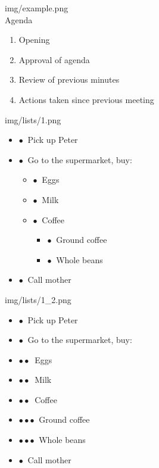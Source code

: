 \documentclass[14pt]{article}
\begin{document}
\fontsize{14}{14}\selectfont
\noindent
img/example.png\\[.5cm]
Agenda
\begin{enumerate}
\item Opening
\item Approval of agenda
\item Review of previous minutes
\item Actions taken since previous meeting
\end{enumerate}
\noindent
img/lists/1.png
\begin{itemize}
\setlength{\itemsep}{0pt}
\setlength{\parskip}{0pt}
\setlength{\parsep}{0pt}
\item $\bullet\ $ Pick up Peter
\item $\bullet\ $ Go to the supermarket, buy:
\begin{itemize}
\setlength{\itemsep}{0pt}
\setlength{\parskip}{0pt}
\setlength{\parsep}{0pt}
\item $\bullet\ $ Eggs
\item $\bullet\ $ Milk
\item $\bullet\ $ Coffee
\begin{itemize}
\setlength{\itemsep}{0pt}
\setlength{\parskip}{0pt}
\setlength{\parsep}{0pt}
\item $\bullet\ $ Ground coffee
\item $\bullet\ $ Whole beans
\end{itemize}
\end{itemize}
\item $\bullet\ $ Call mother
\end{itemize}
\noindent
img/lists/1\_2.png
\begin{itemize}
\setlength{\itemsep}{1pt}
\setlength{\parskip}{0pt}
\setlength{\parsep}{0pt}
\item $\bullet\ $ Pick up Peter
\item $\bullet\ $ Go to the supermarket, buy:
\item $\bullet\bullet\ $ Eggs
\item $\bullet\bullet\ $ Milk
\item $\bullet\bullet\ $ Coffee
\item $\bullet\bullet$$\bullet\ $ Ground coffee
\item $\bullet\bullet$$\bullet\ $ Whole beans
\item $\bullet\ $ Call mother
\end{itemize}
\noindent
\end{document}
